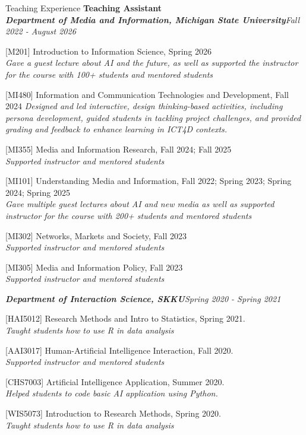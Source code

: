 \documentclass{resume} %
\begin{document}
\begin{rSection}{Teaching Experience}
{\bf Teaching Assistant}
\\\textit{\textbf{Department of Media and Information, Michigan State University}}\hfill {\em Fall 2022 - August 2026} 

[M201] Introduction to Information Science, Spring 2026\\ 
\textit{Gave a guest lecture about AI and the future, as well as supported the instructor for the course with 100+ students and mentored students}

[MI480]  Information and Communication Technologies and Development,  Fall 2024
\textit{Designed and led interactive, design thinking-based activities, including persona development, guided students in tackling project challenges, and provided grading and feedback to enhance learning in ICT4D contexts.}

[MI355] Media and Information Research, Fall 2024; Fall 2025\\ \textit{Supported instructor and mentored students}

[MI101] Understanding Media and Information, Fall 2022; Spring 2023; Spring 2024; Spring 2025\\ 
\textit{Gave multiple guest lectures about AI and new media as well as supported instructor for the course with 200+ students and mentored students}

[MI302] Networks, Markets and Society, Fall 2023\\ \textit{Supported instructor and mentored students}

[MI305] Media and Information Policy, Fall 2023\\ \textit{Supported instructor and mentored students}


\textbf{\textit{Department of Interaction Science, SKKU}}\hfill {\em Spring 2020 - Spring 2021} 
 
[HAI5012]
Research Methods and Intro to Statistics, Spring 2021. \\\textit{Taught students how to use R in data analysis}


[AAI3017]
Human-Artificial Intelligence Interaction, Fall 2020.\\ \textit{Supported instructor and mentored students}


[CHS7003]
Artificial Intelligence Application, Summer 2020.\\ \textit{Helped students to code basic AI application using Python.}

 
[WIS5073]
Introduction to Research Methods, Spring 2020. \\\textit{Taught students how to use R in data analysis}




\end{rSection}
\end{document}

